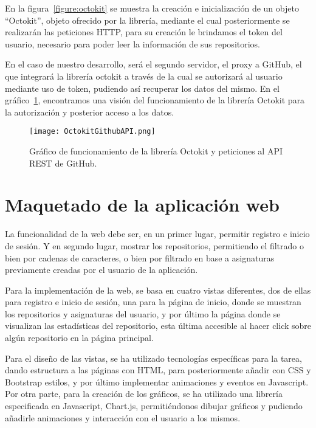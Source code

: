 En la figura~\ref{figure:octokit} se muestra la creación e inicialización
de un objeto “Octokit”, objeto ofrecido por la librería, mediante el cual
posteriormente se realizarán las peticiones HTTP, para su creación le
brindamos el token del usuario, necesario para poder leer la información de
sus repositorios.

En el caso de nuestro desarrollo, será el segundo servidor, el proxy a GitHub, el que integrará la librería octokit a través de la cual se autorizará al usuario mediante uso de token, pudiendo así recuperar los datos del mismo. En el gráfico~\ref{figure:octokitGitApi}, encontramos una visión del funcionamiento de la librería Octokit para la autorización y posterior acceso a los datos. 
\begin{figure}[h!]
  \texttt{[image: OctokitGithubAPI.png]}
  \caption{Gráfico de funcionamiento de la librería Octokit y peticiones al API REST de GitHub.}
  \label{figure:octokitGitApi}
\end{figure}  


\section{Maquetado de la aplicación web}

La funcionalidad de la web debe ser, en un primer lugar, permitir registro
e inicio de sesión. Y en segundo lugar, mostrar los repositorios,
permitiendo el filtrado o bien por cadenas de caracteres, o bien por
filtrado en base a asignaturas previamente creadas por el usuario de la
aplicación.

Para la implementación de la web, se basa en cuatro vistas diferentes, dos
de ellas para registro e inicio de sesión, una para la página de inicio,
donde se muestran los repositorios y asignaturas del usuario, y por último
la página donde se visualizan las estadísticas del repositorio, esta última
accesible al hacer click sobre algún repositorio en la página principal.

Para el diseño de las vistas, se ha utilizado tecnologías específicas para
la tarea, dando estructura a las páginas con HTML, para posteriormente
añadir con CSS\cite{GradienteCSS} y Bootstrap\cite{Bootstrap} estilos, y
por último implementar animaciones y eventos en Javascript. Por otra parte,
para la creación de los gráficos, se ha utilizado una librería especificada
en Javascript, Chart.js\cite{ChartJS,ChartJSIntro}, permitiéndonos dibujar
gráficos y pudiendo añadirle animaciones y interacción con el usuario a los
mismos.

